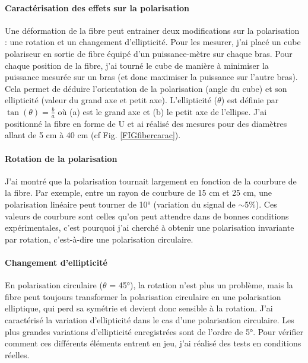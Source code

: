 
\paragraph{Caractérisation des effets sur la polarisation}

Une déformation de la fibre peut entrainer deux modifications sur la polarisation : une rotation et un changement d'ellipticité. Pour les mesurer, j'ai placé un cube polariseur en sortie de fibre équipé d'un puissance-mètre sur chaque bras. Pour chaque position de la fibre, j'ai tourné le cube de manière à minimiser la puissance mesurée sur un bras (et donc maximiser la puissance sur l'autre bras). Cela permet de déduire l'orientation de la polarisation (angle du cube) et son ellipticité (valeur du grand axe et petit axe). L'ellipticité ($\theta$) est définie par $\tan(\theta)=\frac{b}{a}$ où (a) est le grand axe et (b) le petit axe de l'ellipse. J'ai positionné la fibre en forme de U et ai réalisé des mesures pour des diamètres allant de 5 cm à 40 cm (cf Fig. \ref{FIGfibercarac}).

\paragraph{Rotation de la polarisation}

J'ai montré que la polarisation tournait largement en fonction de la courbure de la fibre. Par exemple, entre un rayon de courbure de 15 cm et 25 cm, une polarisation linéaire peut tourner de 10° (variation du signal de $\sim$5\%). Ces valeurs de courbure sont celles qu'on peut attendre dans de bonnes conditions expérimentales, c'est pourquoi j'ai cherché à obtenir une polarisation invariante par rotation, c'est-à-dire une polarisation circulaire.


\paragraph{Changement d'ellipticité}

En polarisation circulaire ($\theta$ = 45°), la rotation n'est plus un problème, mais la fibre peut toujours transformer la polarisation circulaire en une polarisation elliptique, qui perd sa symétrie et devient donc sensible à la rotation. J'ai caractérisé la variation d'ellipticité dans le cas d'une polarisation circulaire. Les plus grandes variations d'ellipticité enregistrées sont de l'ordre de 5°. Pour vérifier comment ces différents éléments entrent en jeu, j'ai réalisé des tests en conditions réelles.

